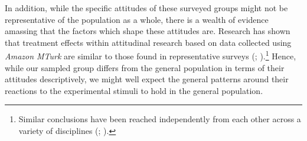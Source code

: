 \documentclass[11pt, ngerman,english,a4]{article}
\begin{document}

In addition, while the specific attitudes of these surveyed groups might not be representative of the population as a whole, there is a wealth of evidence amassing that the factors which shape these attitudes are. Research has shown that treatment effects within attitudinal research based on data collected using \textit{Amazon MTurk} are similar to those found in representative surveys (\citealt{Clifford2015}; \citealt{Coppock2019}).\footnote{Similar conclusions have been reached independently from each other across a variety of disciplines (\citealt{Bartneck2015}; \citealt{Yang2015}).} Hence, while our sampled group differs from the general population in terms of their attitudes descriptively, we might well expect the general patterns around their reactions to the experimental stimuli to hold in the general population. 
\end{document}
